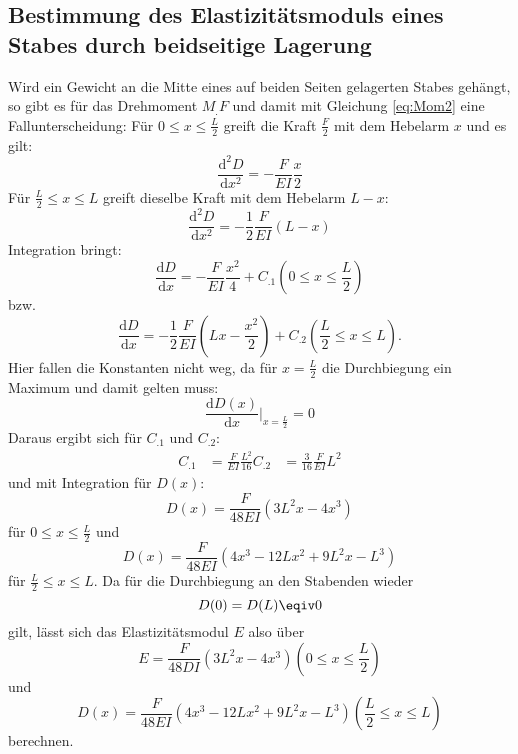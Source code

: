 \subsection{Bestimmung des Elastizitätsmoduls eines Stabes durch beidseitige Lagerung}

Wird ein Gewicht an die Mitte eines auf beiden Seiten gelagerten Stabes gehängt, so gibt es für das Drehmoment $M_.F$ und damit mit Gleichung \eqref{eq:Mom2} eine Fallunterscheidung:
Für $0 \leq x \leq \frac{L}{2}$ greift die Kraft $\frac{F}{2}$ mit dem Hebelarm $x$ und es gilt:
\[
\frac{\mathrm{d}^2D}{\mathrm{d}x^2} = -\frac{F}{E I}\frac{x}{2}
\]
Für $\frac{L}{2} \leq x \leq L$ greift dieselbe Kraft mit dem Hebelarm $L-x$:
\[
\frac{\mathrm{d}^2D}{\mathrm{d}x^2} = -\frac{1}{2}\frac{F}{E I} (L-x)
\]
Integration bringt:
\[
\frac{\mathrm{d}D}{\mathrm{d}x} = -\frac{F}{E I}\frac{x^2}{4} + C_.1  \left(0 \leq x \leq \frac{L}{2}\right)
\]
bzw.
\[
\frac{\mathrm{d}D}{\mathrm{d}x} = -\frac{1}{2}\frac{F}{E I}\left(L x - \frac{x^2}{2}\right) + C_.2  \left(\frac{L}{2} \leq x \leq L\right) \text{.}
\]
Hier fallen die Konstanten nicht weg, da für $x = \frac{L}{2}$ die Durchbiegung ein Maximum und damit gelten muss:
\[
\frac{\mathrm{d}D(x)}{\mathrm{d}x}|_{x = \frac{L}{2}} = 0
\]
Daraus ergibt sich für $C_.1$ und $C_.2$:
\begin{align*}
C_.1 &= \frac{F}{E I}\frac{L^2}{16}
C_.2 &= \frac{3}{16}\frac{F}{E I} L^2
\end{align*}
und mit Integration für $D(x)$:
\begin{equation*}
D(x) = \frac{F}{48 E I}\left(3 L^2 x - 4 x^3\right)
\end{equation*}
für $0 \leq x \leq \frac{L}{2}$ und
\begin{equation*}
D(x) = \frac{F}{48 E I}\left(4 x^3 - 12 L x^2 + 9 L^2 x - L^3\right)
\end{equation*}
für $\frac{L}{2} \leq x \leq L$.
Da für die Durchbiegung an den Stabenden wieder \[D(0)=D(L)\eqiv 0 \] gilt, lässt sich das Elastizitätsmodul $E$ also über
\begin{equation}
E = \frac{F}{48 D I}\left(3 L^2 x - 4 x^3\right)   \left(0 \leq x \leq \frac{L}{2}\right)
\end{equation}
und
\begin{equation}
D(x) = \frac{F}{48 E I}\left(4 x^3 - 12 L x^2 + 9 L^2 x - L^3\right)  \left(\frac{L}{2} \leq x \leq L\right)
\end{equation}
berechnen.